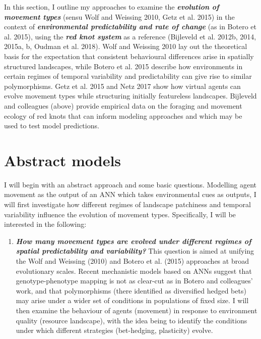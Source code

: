 \documentclass[]{scrartcl}
\begin{document}
\begin{linenumbers}
In this section, I outline my approaches to examine the
\emph{\textbf{evolution of movement types}} (sensu Wolf and Weissing
2010, Getz et al. 2015) in the context of \emph{\textbf{environmental
predictability and rate of change}} (as in Botero et al. 2015), using
the \emph{\textbf{red knot system}} as a reference
(\protect\hypertarget{__UnoMark__3976_580056431}{}{}Bijleveld et al.
2012b, 2014, 2015a, b, Oudman et al. 2018).
\protect\hypertarget{__UnoMark__3983_580056431}{}{}Wolf and Weissing
2010 lay out the theoretical basis for the expectation that consistent
behavioural differences arise in spatially structured landscapes, while
\protect\hypertarget{__UnoMark__3990_580056431}{}{}Botero et al. 2015
describe how environments in certain regimes of temporal variability and
predictability can give rise to similar polymorphisms.
\protect\hypertarget{__UnoMark__3997_580056431}{}{}Getz et al. 2015 and
\protect\hypertarget{__UnoMark__4004_580056431}{}{}Netz 2017 show how
virtual agents can evolve movement types while structuring initially
featureless landscapes. Bijleveld and colleagues (above) provide
empirical data on the foraging and movement ecology of red knots that
can inform modeling approaches and which may be used to test model
predictions.

\section{Abstract models}\label{abstract-models}

I will begin with an abstract approach and some basic questions.
Modelling agent movement as the output of an ANN which takes
environmental cues as outputs, I will first investigate how different
regimes of landscape patchiness and temporal variability influence the
evolution of movement types. Specifically, I will be interested in the
following:

\begin{enumerate}
\def\labelenumi{\arabic{enumi}.}
\item
  
  \emph{\textbf{How many movement types are evolved under different
  regimes of spatial predictability and variability?}} This question is
  aimed at unifying the Wolf and Weissing (2010) and Botero et al.
  (2015) approaches at broad evolutionary scales. Recent mechanistic
  models based on ANNs suggest that genotype-phenotype mapping is not as
  clear-cut as in Botero and colleagues' work, and that polymorphisms
  (there identified as diversified hedged bets) may arise under a wider
  set of conditions in populations of fixed size. I will then examine
  the behaviour of agents (movement) in response to environment quality
  (resource landscape), with the idea being to identify the conditions
  under which different strategies (bet-hedging, plasticity) evolve.
  

\end{enumerate}
\end{linenumbers}
\end{document}

